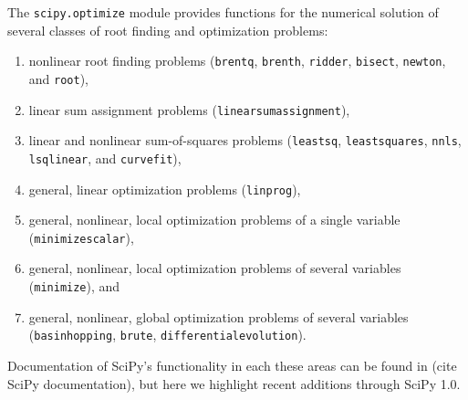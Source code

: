 \newcommand{\RR}{\ensuremath{\mathbb{R}}}
The \texttt{scipy.optimize} module provides functions for the numerical solution of several classes of root finding and optimization problems:
\begin{enumerate}
\item nonlinear root finding problems (\texttt{brentq}, \texttt{brenth}, \texttt{ridder}, \texttt{bisect}, \texttt{newton}, and \texttt{root}),
\item linear sum assignment problems (\texttt{linear\textunderscore sum\textunderscore assignment}),
\item linear and nonlinear sum-of-squares problems (\texttt{leastsq}, \texttt{least\textunderscore squares}, \texttt{nnls}, \texttt{lsq\textunderscore linear}, and \texttt{curve\textunderscore fit}),
\item general, linear optimization problems (\texttt{linprog}),
\item general, nonlinear, local optimization problems of a single variable (\texttt{minimize\textunderscore scalar}),
\item general, nonlinear, local optimization problems of several variables (\texttt{minimize}), and
\item general, nonlinear, global optimization problems of several variables (\texttt{basinhopping}, \texttt{brute}, \texttt{differential\textunderscore evolution}).
\end{enumerate}
Documentation of SciPy's functionality in each these areas can be found in (cite SciPy documentation), but here we highlight recent additions through SciPy 1.0.



